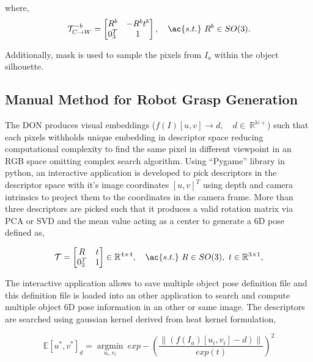 \noindent where,
\begin{equation}
    \mathcal{T}_{C \rightarrow W}^{-b} = \begin{bmatrix}
        R^b   & -R^b t^b \\
        0^T_3 & 1
    \end{bmatrix}, \quad \ac{s.t.} \ R^b \in SO(3).
\end{equation}

Additionally, mask is used to sample the pixels from $I_a$ within the object silhouette.



\subsection{Manual Method for Robot Grasp Generation}

The \ac{DON} produces visual embeddings ($f(I)[u, v] \rightarrow d, \quad d \in \ \mathbb{R}^{\mathbb{N}+}$) such that each pixels withholds unique embedding in descriptor space
reducing computational complexity to find the same pixel in different viewpoint in an \ac{RGB} space omitting complex search algorithm. Using ``Pygame'' \cite{pygame} library in python, an interactive
application is developed to pick descriptors in the descriptor space with it's image coordinates {$[u, v]^T$} using depth and camera intrinsics to project them to the coordinates in the camera frame. More than
three descriptors are picked such that it produces a valid rotation matrix via \ac{PCA} or \ac{SVD} and the mean value acting as a center to generate a 6D pose defined as,

\begin{equation}
    \mathcal{T} = \begin{bmatrix}
        R     & t \\
        0^T_3 & 1
    \end{bmatrix} \in \mathbb{R}^{4 \times 4}, \quad \ac{s.t.} \ R \in SO(3), \ t \in \mathbb{R}^{3 \times 1},
\end{equation}

The interactive application allows to save multiple object pose definition file and this definition file is loaded into an other application to search and compute multiple object
6D pose information in an other or same image. The descriptors are searched using gaussian kernel derived from heat kernel formulation,

\begin{equation}
    \label{eqn:gaussian_kernel}
    \mathbb{E}{[u^*, v^*]_{d}} = \operatorname*{argmin}_{u_i, v_i} \ exp-\left(\dfrac{\|(f(I_a)[u_i, v_i] - d)\|}{exp(t)}\right)^2
\end{equation}

